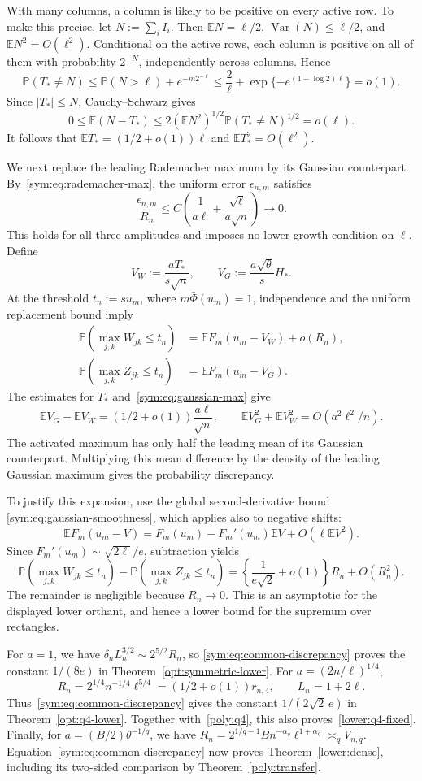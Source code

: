 \documentclass[11pt,letterpaper]{article}
\theoremstyle{remark}
\newcommand{\E}{\mathbb E}
\newcommand{\Pp}{\mathbb P}
\newcommand{\Var}{\operatorname{Var}}
\begin{document}
With many columns, a column is likely to be positive on every active
row. To make this precise, let \(N:=\sum_iI_i\). Then
\(\E N=\ell/2\), \(\Var(N)\le\ell/2\), and
\(\E N^2=O(\ell^2)\). Conditional on the active rows, each column
is positive on all of them with probability \(2^{-N}\), independently
across columns. Hence
\[
 \Pp(T_*\ne N)\le\Pp(N>\ell)+e^{-m2^{-\ell}}
 \le\frac2\ell+\exp\{-e^{(1-\log2)\ell}\}=o(1).
\]
Since \(|T_*|\le N\), Cauchy--Schwarz gives
\[
 0\le\E(N-T_*)\le2(\E N^2)^{1/2}
       \Pp(T_*\ne N)^{1/2}=o(\ell).
\]
It follows that \(\E T_*=(1/2+o(1))\ell\) and
\(\E T_*^2=O(\ell^2)\).

We next replace the leading Rademacher maximum by its Gaussian
counterpart. By~\eqref{sym:eq:rademacher-max}, the uniform error
\(\epsilon_{n,m}\) satisfies
\[
 \frac{\epsilon_{n,m}}{R_n}
 \le C\left(\frac1{a\ell}
                  +\frac{\sqrt\ell}{a\sqrt n}\right)\longrightarrow0.
\]
This holds for all three amplitudes and imposes no lower growth condition
on \(\ell\). Define
\[
 V_W:=\frac{aT_*}{s\sqrt n},\qquad
 V_G:=\frac{a\sqrt\theta}{s}H_*.
\]
At the threshold \(t_n:=s u_m\), where
\(m\bar\Phi(u_m)=1\), 
independence and the uniform replacement bound imply
\begin{align*}
 \Pp(\max_{j,k}W_{jk}\le t_n)&=\E F_m(u_m-V_W)+o(R_n),\\
 \Pp(\max_{j,k}Z_{jk}\le t_n)&=\E F_m(u_m-V_G).
\end{align*}
The estimates for \(T_*\) and~\eqref{sym:eq:gaussian-max} give
\[
 \E V_G-\E V_W=(1/2+o(1))\frac{a\ell}{\sqrt n},\qquad
 \E V_G^2+\E V_W^2=O(a^2\ell^2/n).
\]
The activated maximum has only half the leading mean of its Gaussian
counterpart. Multiplying this mean difference by the density of the
leading Gaussian maximum gives the probability discrepancy.

To justify this expansion, use the global second-derivative bound
\eqref{sym:eq:gaussian-smoothness}, which applies also to negative
shifts:
\[
 \E F_m(u_m-V)=F_m(u_m)-F_m'(u_m)\E V+O(\ell\E V^2).
\]
Since \(F_m'(u_m)\sim\sqrt{2\ell}/e\), subtraction yields
\begin{equation}
 \Pp(\max_{j,k}W_{jk}\le t_n)
 -\Pp(\max_{j,k}Z_{jk}\le t_n)
 =\left\{\frac1{e\sqrt2}+o(1)\right\}R_n+O(R_n^2).
 \label{sym:eq:common-discrepancy}
\end{equation}
The remainder is negligible because \(R_n\to0\). This is an
asymptotic for the displayed lower orthant, and hence a lower bound
for the supremum over rectangles.

For \(a=1\), we have
\(\delta_nL_n^{3/2}\sim2^{5/2}R_n\), so
\eqref{sym:eq:common-discrepancy} proves the constant \(1/(8e)\)
in Theorem~\ref{opt:symmetric-lower}.
For \(a=(2n/\ell)^{1/4}\),
\[
 R_n=2^{1/4}n^{-1/4}\ell^{5/4}
       =(1/2+o(1))r_{n,4},\qquad L_n=1+2\ell.
\]
Thus~\eqref{sym:eq:common-discrepancy} gives the constant
\(1/(2\sqrt2\,e)\) in Theorem~\ref{opt:q4-lower}.
Together with~\eqref{poly:q4}, this also proves~\eqref{lower:q4-fixed}.
Finally, for \(a=(B/2)\theta^{-1/q}\), we have
\(R_n=2^{1/q-1}Bn^{-\alpha_q}\ell^{1+\alpha_q}\asymp_q V_{n,q}\).
Equation~\eqref{sym:eq:common-discrepancy} now proves
Theorem~\ref{lower:dense}, including its two-sided comparison by
Theorem~\ref{poly:transfer}.
\end{document}
